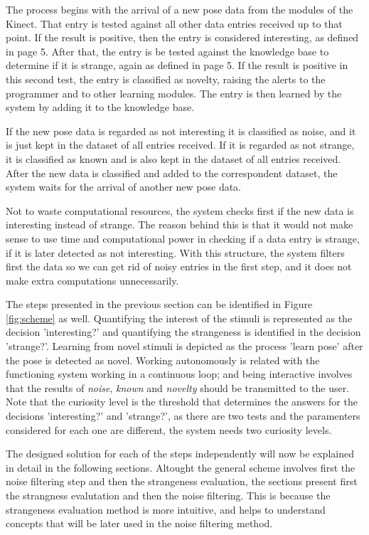 The process begins with the arrival of a new pose data from the modules of the Kinect. That entry is tested against all other data entries received up to that point. If the result is positive, then the entry is considered interesting, as defined in page 5. After that, the entry is be tested against the knowledge base to determine if it is strange, again as defined in page 5. If the result is positive in this second test, the entry is classified as novelty, raising the alerts to the programmer and to other learning modules. The entry is then learned by the system by adding it to the knowledge base.   

If the new pose data is regarded as not interesting it is classified as noise, and it is just kept in the dataset of all entries received. If it is regarded as not strange, it is classified as known and is also kept in the dataset of all entries received. After the new data is classified and added to the correspondent dataset, the system waits for the arrival of another new pose data.     

Not to waste computational resources, the system checks first if the new data is interesting instead of strange. The reason behind this is that it would not make sense to use time and computational power in checking if a data entry is strange, if it is later detected as not interesting. With this structure, the system filters first the data so we can get rid of noisy entries in the first step, and it does not make extra computations unnecessarily. 

The steps presented in the previous section can be identified in Figure \ref{fig:scheme} as well. Quantifying the interest of the stimuli is represented as the decision 'interesting?' and quantifying the strangeness is identified in the decision 'strange?'. Learning from novel stimuli is depicted as the process 'learn pose' after the pose is detected as novel. Working autonomously is related with the functioning system working in a continuous loop; and being interactive involves that the results of \emph{noise}, \emph{known} and \emph{novelty} should be transmitted to the user. Note that the curiosity level is the threshold that determines the answers for the decisions 'interesting?' and 'strange?', as there are two tests and the paramenters considered for each one are different, the system needs two curiosity levels.

The designed solution for each of the steps independently will now be explained in detail in the following sections. Altought the general scheme involves first the noise filtering step and then the strangeness evaluation, the sections present first the strangness evalutation and then the noise filtering. This is because the strangeness evaluation method is more intuitive, and helps to understand concepts that will be later used in the noise filtering method.

